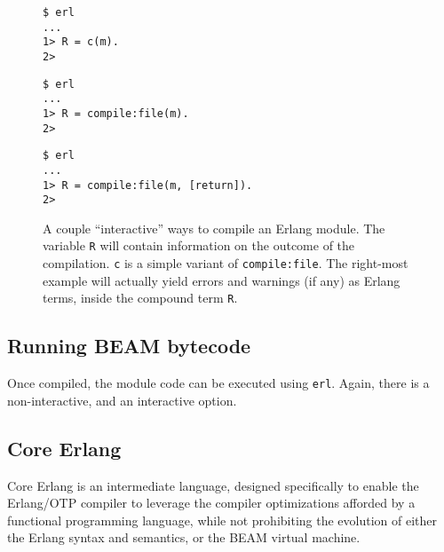 \begin{figure}[ht!]
\begin{minipage}[t]{0.2\textwidth}
\begin{lstlisting}
$ erl
...
1> R = c(m).
2>
\end{lstlisting}
\end{minipage}%
\begin{minipage}[t]{0.35\textwidth}
\begin{lstlisting}
$ erl
...
1> R = compile:file(m).
2>
\end{lstlisting}
\end{minipage}%
\begin{minipage}[t]{0.45\textwidth}
\begin{lstlisting}
$ erl
...
1> R = compile:file(m, [return]).
2>
\end{lstlisting}
\end{minipage}%
\caption{A couple ``interactive'' ways to compile an Erlang module.
The variable \texttt{R} will contain information on the outcome of the
compilation. \texttt{c} is a simple variant of \texttt{compile:file}.
The right-most example will actually yield errors and warnings (if
any) as Erlang terms, inside the compound term \texttt{R}.}
\label{fig:erl-c}
\end{figure}

\subsection{Running BEAM bytecode}

Once compiled, the module code can be executed using \texttt{erl}.
Again, there is a non-interactive, and an interactive option.

\subsection{Core Erlang}

Core Erlang\cite{erlang:erlang:2001:core-intro, erlang:2004:core-spec}
is an intermediate language, designed specifically to enable the
Erlang/OTP compiler to leverage the compiler optimizations afforded by
a functional programming language, while not prohibiting the evolution
of either the Erlang syntax and semantics, or the BEAM virtual
machine.

